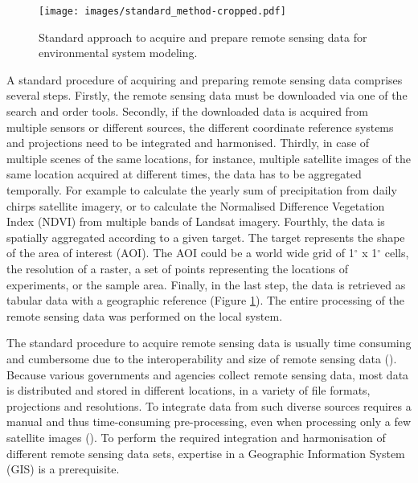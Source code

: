 \begin{center}
	\begin{figure}[h]
		\begin{center}
			\texttt{[image: images/standard\_method-cropped.pdf]}
			\caption{Standard approach to acquire and prepare remote sensing data for environmental system modeling.}
			\label{traditionl_approach}
		\end{center}
	\end{figure}
\end{center}


A standard procedure of acquiring and preparing remote sensing data comprises several steps. Firstly, the remote sensing data must be downloaded via one of the search and order tools. Secondly, if the downloaded data is acquired from multiple sensors or different sources, the different coordinate reference systems and projections need to be integrated and harmonised. Thirdly, in case of multiple scenes of the same locations, for instance, multiple satellite images of the same location acquired at different times, the data has to be aggregated temporally. For example to calculate the yearly sum of precipitation from daily chirps satellite imagery, or to calculate the Normalised Difference Vegetation Index (NDVI) from multiple bands of Landsat imagery.
Fourthly, the data is spatially aggregated according to a given target. The target represents the shape of the area of interest (AOI). The AOI could be a world wide grid of 1$^\circ$ x 1$^\circ$ cells, the resolution of a raster, a set of points representing the locations of experiments, or the sample area. Finally, in the last step, the data is retrieved as tabular data with a geographic reference (Figure \ref{traditionl_approach}). The entire processing of the remote sensing data was performed on the local system.

The standard procedure to acquire remote sensing data is usually time consuming and cumbersome due to the interoperability and size of remote sensing data (\cite{iosifescu2011geovite}).
Because various governments and agencies collect remote sensing data, most data is distributed and stored in different locations, in a variety of file formats, projections and resolutions. To integrate data from such diverse sources requires a manual and thus time-consuming pre-processing, even when processing only a few satellite images (\cite{schell2000geodata}). To perform the required integration and harmonisation of different remote sensing data sets, expertise in a Geographic Information System (GIS) is a prerequisite.


